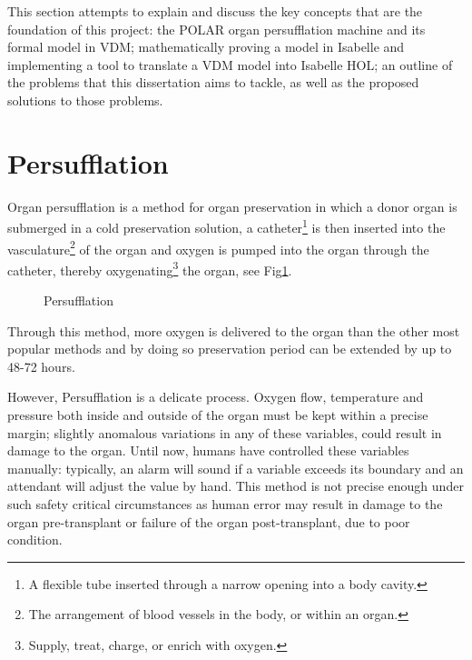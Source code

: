 This section attempts to explain and discuss the key concepts that are the foundation of this project: the POLAR organ persufflation machine and its formal model in VDM; mathematically proving a model in Isabelle and implementing a tool to translate a VDM model into Isabelle HOL; an outline of the problems that this dissertation aims to tackle, as well as the proposed solutions to those problems.

\section{Persufflation}
Organ persufflation is a method for organ preservation in which a donor organ is submerged in a cold preservation solution, a catheter\footnote{A flexible tube inserted through a narrow opening into a body cavity.} is then inserted into the vasculature\footnote{The arrangement of blood vessels in the body, or within an organ.} of the organ and oxygen is pumped into the organ through the catheter, thereby oxygenating\footnote{Supply, treat, charge, or enrich with oxygen.} the organ, see Fig\ref{fig:Persufflation}.\begin{figure}
        \caption{\label{fig:Persufflation} Persufflation \parencite{Dholakia2018}}
      \end{figure} Through this method, more oxygen is delivered to the organ than the other most popular methods and by doing so preservation period can be extended by up to 48-72 hours\parencite{Suszynski2013}. 

However, Persufflation is a delicate process. Oxygen flow, temperature and pressure both inside and outside of the organ must be kept within a precise margin; slightly anomalous variations in any of these variables, could result in damage to the organ. 
Until now, humans have controlled these variables manually: typically, an alarm will sound if a variable exceeds its boundary and an attendant will adjust the value by hand. This method is not precise enough under such safety critical circumstances as human error may result in damage to the organ pre-transplant or failure of the organ post-transplant, due to poor condition.

